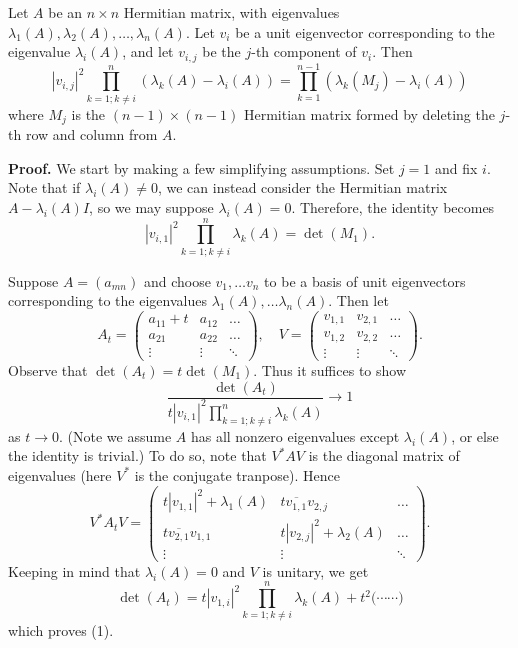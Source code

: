 \documentclass[12pt, letterpaper]{article}
\renewcommand{\l}{\lambda}
\begin{document}
\begin{tcolorbox}[colback=blue!5!white,colframe=blue!75!black]
    Let $A$ be an $n \times n$ Hermitian matrix, with eigenvalues $\l_1(A), \l_2(A), \dots, \l_n(A)$. Let $v_i$ be a unit eigenvector corresponding to the eigenvalue $\l_i(A)$, and let $v_{i,j}$ be the $j$-th component of $v_i$. Then
    \[
        |v_{i,j}|^2 \prod_{k = 1; k \neq i}^n (\l_k(A) - \l_i(A))
        = \prod_{k = 1}^{n-1}(\l_k(M_j) - \l_i(A))
    \]
    where $M_j$ is the $(n-1) \times (n-1)$ Hermitian matrix formed by deleting the $j$-th row and column from $A$.
\end{tcolorbox}

\textbf{Proof.} We start by making a few simplifying assumptions. Set $j = 1$ and fix $i$. Note that if $\l_i(A) \neq 0$, we can instead consider the Hermitian matrix $A - \l_i(A)I$, so we may suppose $\l_i(A) = 0$. Therefore, the identity becomes
\[
    |v_{i,1}|^2 \prod_{k = 1; k \neq i}^n \l_k(A)
    = \det(M_1). 
\]

Suppose $A = (a_{mn})$ and choose $v_1, \dots v_n$ to be a basis of unit eigenvectors corresponding to the eigenvalues $\l_1(A), \dots \l_n(A)$. Then let
\[
    A_t = 
    \begin{pmatrix}
        a_{11} + t  & a_{12}    & \dots\\
        a_{21}      & a_{22}    & \dots\\
        \vdots      & \vdots    & \ddots
    \end{pmatrix},
    \quad
    V =
    \begin{pmatrix}
        v_{1,1} & v_{2,1} & \dots\\
        v_{1,2} & v_{2,2} & \dots\\
        \vdots      & \vdots    & \ddots
    \end{pmatrix}.
\]
Observe that $\det(A_t) = t\det(M_1)$. Thus it suffices to show
\begin{equation}
    \frac{\det(A_t)}{
    t|v_{i,1}|^2 \prod_{k = 1; k \neq i}^n \l_k(A)
    } \rightarrow 1
\end{equation}
as $t \rightarrow 0$. (Note we assume $A$ has all nonzero eigenvalues except $\l_i(A)$, or else the identity is trivial.) To do so, note that $V^*AV$ is the diagonal matrix of eigenvalues (here $V^*$ is the conjugate tranpose). Hence
\[
    V^* A_t V
    =
    \begin{pmatrix}
        t|v_{1,1}|^2 + \l_1(A)   & t\overline{v_{1,1}}v_{2,j} & \dots\\
        t\overline{v_{2,1}}v_{1,1}   & t|v_{2,j}|^2 + \l_2(A) & \dots\\
        \vdots                  & \vdots                & \ddots
    \end{pmatrix}.
\]
Keeping in mind that $\l_i(A) = 0$ and $V$ is unitary, we get
\[
    \det(A_t) = t|v_{1,i}|^2 \prod_{k = 1; k \neq i}^n \l_k(A)
    + t^2\Big( \cdots \cdots \Big)
\]
which proves (1).
\end{document}
